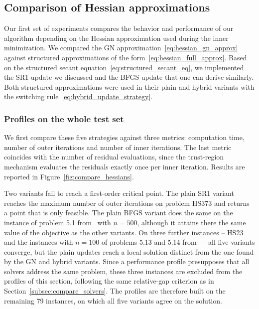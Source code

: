 \subsection{Comparison of Hessian approximations}\label{subsec:compare_hessians}

Our first set of experiments compares the behavior and performance of our algorithm depending on the Hessian approximation used during the inner minimization. We compared the GN approximation~\eqref{eq:hessian_gn_approx} against structured approximations of the form~\eqref{eq:hessian_full_approx}. Based on the structured secant equation~\eqref{eq:structured_secant_eq}, we implemented the SR1 update we discussed and the BFGS update that one can derive similarly. Both structured approximations were used in their plain and hybrid variants with the switching rule~\eqref{eq:hybrid_update_strategy}.

\subsubsection{Profiles on the whole test set}

We first compare these five strategies against three metrics: computation time, number of outer iterations and number of inner iterations. The last metric coincides with the number of residual evaluations, since the trust-region mechanism evaluates the residuals exactly once per inner iteration. Results are reported in Figure~\ref{fig:compare_hessians}.

Two variants fail to reach a first-order critical point. The plain SR1 variant reaches the maximum number of outer iterations on problem HS373 and returns a point that is only feasible. The plain BFGS variant does the same on the instance of problem 5.1 from~\cite{lucksanvlcek:1999} with $n=500$, although it attains there the same value of the objective as the other variants. On three further instances -- HS23 and the instances with $n = 100$ of problems 5.13 and 5.14 from~\cite{lucksanvlcek:1999} -- all five variants converge, but the plain updates reach a local solution distinct from the one found by the GN and hybrid variants. Since a performance profile presupposes that all solvers address the same problem, these three instances are excluded from the profiles of this section, following the same relative-gap criterion as in Section~\ref{subsec:compare_solvers}. The profiles are therefore built on the remaining 79 instances, on which all five variants agree on the solution.

